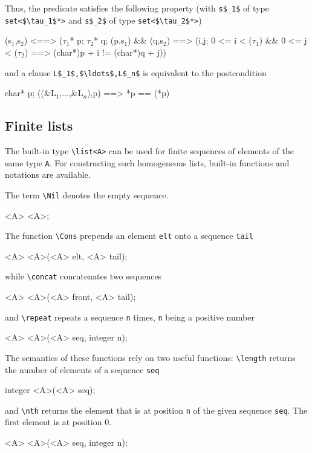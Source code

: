 Thus, the \separated predicate satisfies the following property (with
\lstinline|s$_1$| of type \lstinline|set<$\tau_1$*>| and \lstinline|s$_2$| of type
\lstinline|set<$\tau_2$*>|)
\begin{listing}{1}
\separated(s$_1$,s$_2$) <==>
  (\forall $\tau_1$* p; \forall $\tau_2$* q;
     \subset(p,s$_1$) && \subset(q,s$_2$) ==>
       (\forall \integer i,j;
         0 <= i < \sizeof($\tau_1$) && 0 <= j < \sizeof($\tau_2$) ==>
           (char*)p + i != (char*)q + j))
\end{listing}

and a clause \assigns \lstinline|L$_1$,$\ldots$,L$_n$| is equivalent
to the postcondition
\begin{listing-nonumber}
\forall char* p; \separated(\union(&L$_1$,$\ldots$,&L$_n$),p) ==> *p == \old(*p)
\end{listing-nonumber}



\subsection{Finite lists}\label{sec:lists}
The built-in type \lstinline|\list<A>| can be used for finite 
sequences of elements of the same type \lstinline|A|. 
For constructing such homogeneous lists, built-in functions and notations are 
available.

The term \lstinline|\Nil| denotes the empty sequence.
\begin{listing-nonumber}
\list<A> \Nil<A>;
\end{listing-nonumber}

The function \lstinline|\Cons| prepends an element \lstinline|elt| 
onto a sequence \lstinline|tail|
\begin{listing-nonumber}
\list<A> \Cons<A>(<A> elt, \list<A> tail);
\end{listing-nonumber}
while \lstinline|\concat| concatenates two sequences
\begin{listing-nonumber}
\list<A> \concat<A>(\list<A> front, \list<A> tail);
\end{listing-nonumber}
and \lstinline|\repeat| repeats a sequence \lstinline|n| times, \lstinline|n| being a positive number
\begin{listing-nonumber}
\list<A> \repeat<A>(\list<A> seq, integer n);
\end{listing-nonumber}

The semantics of these functions rely on two useful functions: 
\lstinline|\length| returns the number of elements of 
a sequence \lstinline|seq| 
\begin{listing-nonumber}
integer \length<A>(\list<A> seq);
\end{listing-nonumber}
and \lstinline|\nth| returns the element that is at position 
\lstinline|n| of the given sequence \lstinline|seq|.
The first element is at position $0$. 
\begin{listing-nonumber}
<A> \nth<A>(\list<A> seq, integer n);
\end{listing-nonumber}

